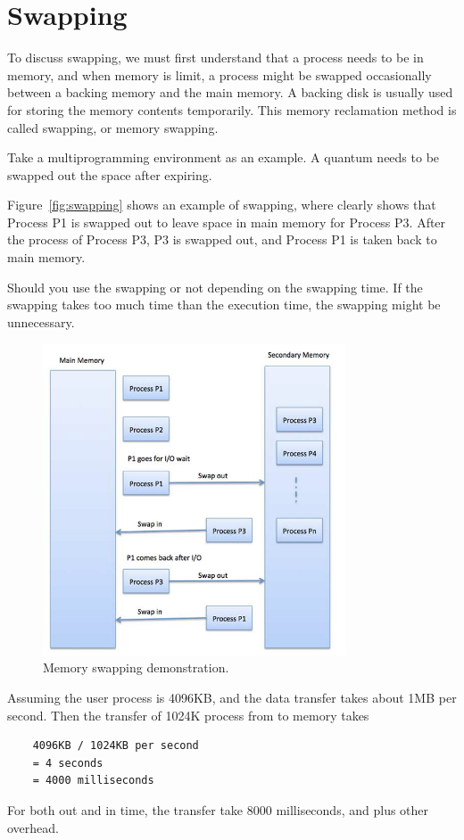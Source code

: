 \documentclass[doc,natbib,12pt]{apa6}
\begin{document}
	\newpage
	\section{Swapping} \label{chp:swapping}
	To discuss swapping, we must first understand that a process needs to be in memory, and when memory is limit, a process might be swapped occasionally between a backing memory and the main memory. A backing disk is usually used for storing the memory contents temporarily. This memory reclamation method is called swapping, or memory swapping.
	
	Take a multiprogramming environment as an example. A quantum needs to be swapped out the space after expiring. 
	
		Figure~\vref{fig:swapping} shows an example of swapping, where clearly shows that Process P1 is swapped out to leave space in main memory for Process P3. After the process of Process P3, P3 is swapped out, and Process P1 is taken back to main memory.
	
	Should you use the swapping or not depending on the swapping time. If the swapping takes too much time than the execution time, the swapping might be unnecessary.
	
	\begin{figure}[th]
		\centering
		\includegraphics[width=0.8\textwidth]{swapping.png}
		\caption{\label{fig:swapping}Memory swapping demonstration. \citep{tutorialspoint2018}}
	\end{figure}
	
	Assuming the user process is 4096KB, and the data transfer takes about 1MB per second. Then the transfer of 1024K process from to memory takes
	\begin{verbatim}
	4096KB / 1024KB per second
	= 4 seconds
	= 4000 milliseconds
	\end{verbatim}
	For both out and in time, the transfer take 8000 milliseconds, and plus other overhead.
	
\end{document}
